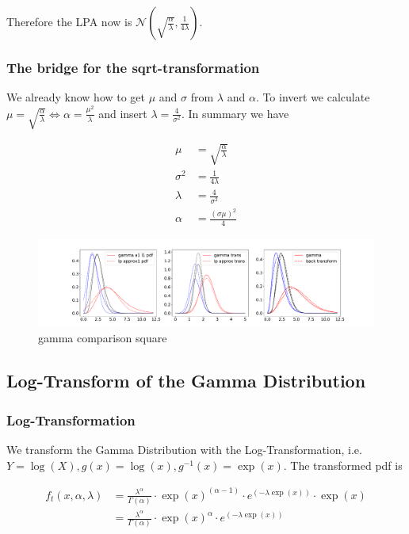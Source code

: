 Therefore the LPA now is $\mathcal{N}\left(\sqrt{\frac{\alpha}{\lambda}}, \frac{1}{4\lambda} \right)$.

\subsubsection{The bridge for the sqrt-transformation}

We already know how to get $\mu$ and $\sigma$ from $\lambda$ and $\alpha$. To invert we calculate $\mu = \sqrt{\frac{\alpha}{\lambda}} \Leftrightarrow \alpha = \frac{\mu^2}{\lambda}$ and insert $\lambda=\frac{4}{\sigma^2}$. In summary we have

\begin{align}
\mu &= \sqrt{\frac{\alpha}{\lambda}} \\
\sigma^2 &= \frac{1}{4\lambda} \\
\lambda &= \frac{4}{\sigma^2} \\
\alpha &= \frac{(\sigma\mu)^2}{4} 
\end{align}

\begin{figure}[!htb]
	\centering
	\includegraphics[width=\textwidth]{figures/gamma_playground_sqrt.pdf}
	\caption{gamma comparison square}
	\label{fig:gamma_comparison_square}
\end{figure}

\subsection{Log-Transform of the Gamma Distribution}

\subsubsection{Log-Transformation}

We transform the Gamma Distribution with the Log-Transformation, i.e. $Y = \log(X), g(x) = \log(x), g^{-1}(x) = \exp(x)$. The transformed pdf is

\begin{align}
f_t(x, \alpha, \lambda) &= \frac{\lambda^\alpha}{\Gamma(\alpha)} \cdot \exp(x)^{(\alpha - 1)} \cdot e^{(-\lambda \exp(x))} \cdot \exp(x) \\ \nonumber
&=\frac{\lambda^\alpha}{\Gamma(\alpha)} \cdot \exp(x)^{\alpha} \cdot e^{(-\lambda \exp(x))}
\end{align}

